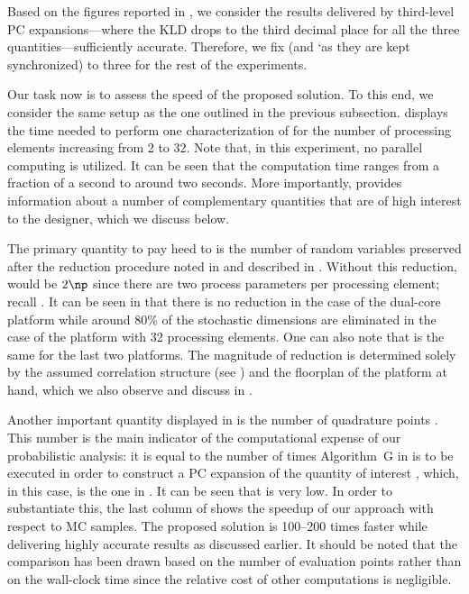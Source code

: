 Based on the figures reported in , we consider
the results delivered by third-level \ac{PC} expansions---where the \ac{KLD}
drops to the third decimal place for all the three quantities---sufficiently
accurate. Therefore, we fix \lc (and \lq as they are kept synchronized) to three
for the rest of the experiments.


Our task now is to assess the speed of the proposed solution. To this end, we
consider the same setup as the one outlined in the previous subsection.
 displays the time needed to perform one
characterization of \vg for the number of processing elements \np increasing
from 2 to 32. Note that, in this experiment, no parallel computing is utilized.
It can be seen that the computation time ranges from a fraction of a second to
around two seconds. More importantly,  provides
information about a number of complementary quantities that are of high interest
to the designer, which we discuss below.

The primary quantity to pay heed to is the number of random variables \nz
preserved after the reduction procedure noted in  and
described in . Without this reduction, \nz
would be $2 \np$ since there are two process parameters per processing element;
recall . It can be seen in
 that there is no reduction in the case of the
dual-core platform while around 80\% of the stochastic dimensions are eliminated
in the case of the platform with 32 processing elements. One can also note that
\nz is the same for the last two platforms. The magnitude of reduction is
determined solely by the assumed correlation structure (see
) and the floorplan of the platform at
hand, which we also observe and discuss in .

Another important quantity displayed in  is the
number of quadrature points \nq. This number is the main indicator of the
computational expense of our probabilistic analysis: it is equal to the number
of times Algorithm~G in  is to be executed in order to
construct a \ac{PC} expansion of the quantity of interest \g, which, in this
case, is the one in . It can be seen that \nq
is very low. In order to substantiate this, the last column of
 shows the speedup of our approach with respect
to  \ac{MC} samples. The proposed solution is 100--200 times faster
while delivering highly accurate results as discussed earlier. It should be
noted that the comparison has been drawn based on the number of evaluation
points rather than on the wall-clock time since the relative cost of other
computations is negligible.

